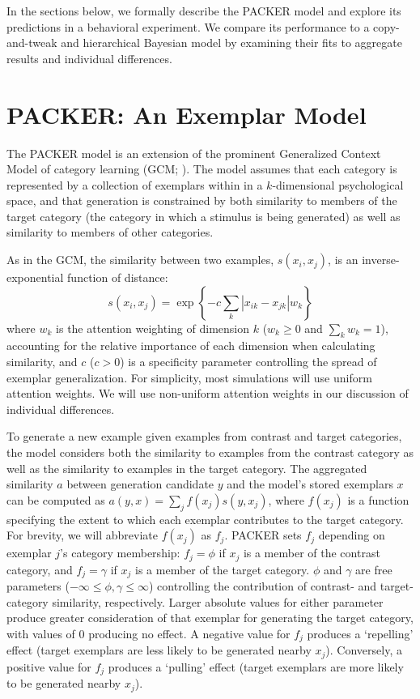 \documentclass[10pt,letterpaper]{article}
\begin{document}
In the sections below, we formally describe the PACKER model and explore its predictions in a behavioral experiment. We compare its performance to a copy-and-tweak and hierarchical Bayesian model by examining their fits to aggregate results and individual differences.

\section{PACKER: An Exemplar Model}

The PACKER model is an extension of the prominent Generalized Context Model of category learning (GCM; \citealp{nosofsky1984abbr}). The model assumes that each category is represented by a collection of exemplars within in a $k$-dimensional psychological space, and that generation is constrained by both similarity to members of the target category (the category in which a stimulus is being generated) as well as similarity to members of other categories. 

As in the GCM, the similarity between two examples, $s\left(x_i, x_j\right)$, is an inverse-exponential function of distance:
\begin{equation}
  s\left(x_i,x_j\right) = \exp \left\{ -c \sum_{k}{ \left| x_{ik} - x_{jk} \right|}w_k \right\}
  \label{eq:similarity}
\end{equation}
where $w_k$ is the attention weighting of dimension $k$ ($w_k \geq 0$ and $\sum_k{w_k} = 1$), accounting for the relative importance of each dimension when calculating similarity, and $c$ ($c>0$) is a specificity parameter controlling the spread of exemplar generalization. For simplicity, most simulations will use uniform attention weights. We will use non-uniform attention weights in our discussion of individual differences.  


To generate a new example given examples from contrast and target categories, the model considers both the similarity to examples from the contrast category as well as the similarity to examples in the target category. The aggregated similarity $a$ between generation candidate $y$ and the model's stored exemplars $x$ can be computed as $a(y, x) = \sum_j{f(x_j) s(y, x_j)}$, where $f(x_j)$ is a function specifying the extent to which each exemplar contributes to the target category. For brevity, we will abbreviate $f(x_j)$ as $f_j$. PACKER sets $f_j$ depending on exemplar $j$'s category membership: $f_j = \phi$ if $x_j$ is a member of the contrast category, and $f_j = \gamma$ if $x_j$ is a member of the target category. $\phi$ and $\gamma$ are free parameters ($-\infty \leq \phi, \gamma \leq \infty$) controlling the contribution of contrast- and target-category similarity, respectively. Larger absolute values for either parameter produce greater consideration of that exemplar for generating the target category, with values of 0 producing no effect. A negative value for $f_j$ produces a `repelling' effect (target exemplars are less likely to be generated nearby $x_j$). Conversely, a positive value for $f_j$ produces a `pulling' effect (target exemplars are more likely to be generated nearby $x_j$). 
\end{document}
